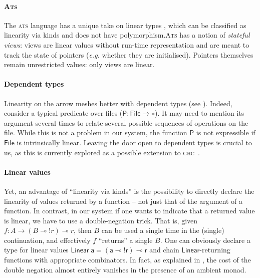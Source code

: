\documentclass[acmsmall,screen]{acmart}\settopmatter{}
\newcommand{\Conid}[1]{\mathit{#1}}
\newcommand{\Varid}[1]{\mathit{#1}}
\renewcommand\Varid[1]{\mathord{\textsf{#1}}}
\renewcommand\Conid[1]{\mathord{\textsf{#1}}}
\newcommand{\ghc}{\textsc{ghc}\xspace}
\begin{document}
  \paragraph{\textsc{Ats}} The \textsc{ats} language has a unique take
  on linear types \cite{zhu_linear-views_2005}, which can be
  classified as linearity via kinds and does not have
  polymorphism.\textsc{Ats} has a notion of \emph{stateful views}: views are
  linear values without run-time representation and are meant to
  track the state of pointers (\emph{e.g.} whether they are
  initialised). Pointers themselves remain unrestricted values: only
  views are linear.

  \paragraph{Dependent types}
  Linearity on the arrow meshes better with dependent types (see
  ).  Indeed, consider a typical
  predicate over files (\ensuremath{\Conid{P}\mathbin{:}\Conid{File}\mathbin{→}\mathbin{∗}}). It may need to mention its
  argument several times to relate several possible sequences of
  operations on the file. While this is not a problem in our system,
  the function \ensuremath{\Conid{P}} is not expressible if \ensuremath{\Conid{File}} is intrinsically
  linear. Leaving the door open to dependent types is crucial to us,
  as this is currently explored as a possible extension to
  \ghc{}~\cite{weirich_dependent-haskell_2017}.

\paragraph{Linear values}
Yet, an advantage of ``linearity via kinds'' is the possibility to directly
declare the linearity of values returned by a function -- not just that
of the argument of a function. In contrast, in our system if one wants
to indicate that a returned value is linear, we have to
use a double-negation trick. That is, given $f : A → (B ⊸ !r) ⊸ r$,
then $B$ can be used a single time in the (single) continuation, and
effectively $f$ ``returns'' a single $B$. One can obviously declare a
type for linear values \ensuremath{\Conid{Linear}\;\Varid{a}\mathrel{=}(\Varid{a}\mathbin{⊸}\mathbin{!}\Varid{r})\mathbin{⊸}\Varid{r}} and chain
\ensuremath{\Conid{Linear}}-returning functions with appropriate combinators.  In fact,
as explained in , the cost of the double negation
almost entirely vanishes in the presence of an ambient monad.
\end{document}
